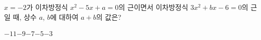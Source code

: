 $x=-2$가 이차방정식 $x^2-5x+a=0$의 근이면서 이차방정식 $3x^2+bx-6=0$의 근일 때, 상수 $a$, $b$에 대하여 $a+b$의 값은?
\begin{choices32}{$-11$}{$-9$}{$-7$}{$-5$}{$-3$}\end{choices32}
